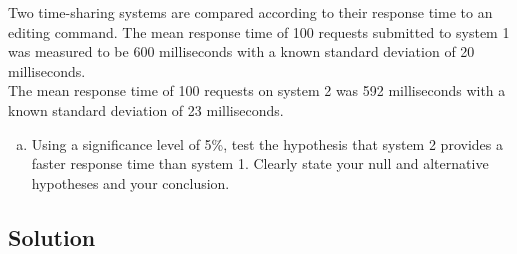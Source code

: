 \documentclass[a4paper,12pt]{article}
\begin{document}
\large 

\noindent Two time-sharing systems are compared according to their response time to an editing command. The mean response time of 100 requests submitted to system 1 was measured to be 600 milliseconds with a known standard deviation of 20 milliseconds. \\
\noindent The mean response time of 100 requests on system 2 was 592 milliseconds with a known standard deviation of 23 milliseconds. 
\medskip
 

\begin{enumerate}[(a)]
\item Using a significance level of 5\%,
 test the hypothesis that system 2 provides a faster response time than
 system 1. Clearly state your null and alternative hypotheses and your
 conclusion.
\end{enumerate}


\subsection*{Solution} 
\end{document}
